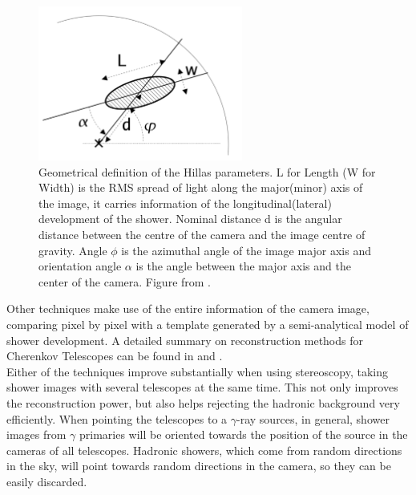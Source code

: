 \documentclass[main.tex]{subfiles}
\begin{document}
\begin{figure}[h]
    \centering
    \includegraphics[width=0.6\textwidth]{Pictures/Hillaspars.pdf}
    \caption{Geometrical definition of the Hillas parameters. L for Length (W for Width) is the RMS spread of light along the major(minor) axis of the image, it carries information of the longitudinal(lateral) development of the shower. Nominal distance d is the angular distance between the centre of the camera and the image centre of gravity. Angle $\phi$ is the azimuthal angle of the image major axis and orientation angle $\alpha$ is the angle between the major axis and the center of the camera. Figure from \cite{2006analysismethodscherenkovtels}. }
    \label{fig:hillas}
\end{figure}

Other techniques make use of the entire information of the camera image, comparing pixel by pixel with a template generated by a semi-analytical model of shower development. A detailed summary on reconstruction methods for Cherenkov Telescopes can be found in \cite{2006analysismethodscherenkovtels} and \cite{2015groundbasedtechniques}.\\


Either of the techniques improve substantially when using stereoscopy, taking shower images with several telescopes at the same time. This not only improves the reconstruction power, but also helps rejecting the hadronic background very efficiently. When pointing the telescopes to a $\gamma$-ray sources, in general, shower images from $\gamma$ primaries will be oriented towards the position of the source in the cameras of all telescopes. Hadronic showers, which come from random directions in the sky, will point towards random directions in the camera, so they can be easily discarded. 
\end{document}
